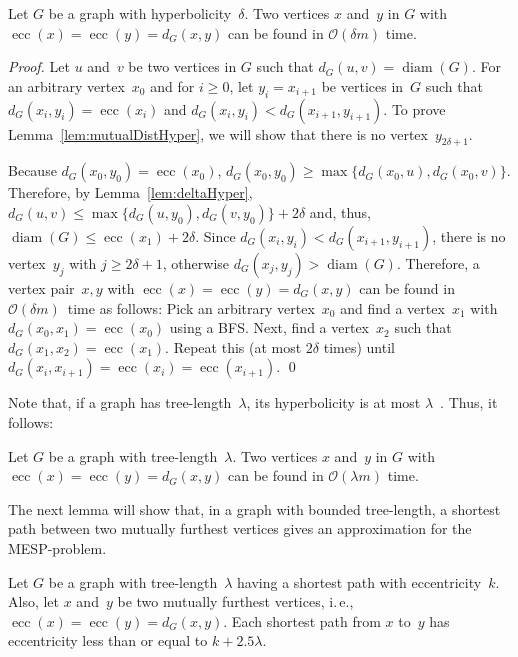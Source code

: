 \documentclass[10pt]{llncs}
\makeatletter
\newcommand{\calO}{\mathcal{O}}
\newcommand{\ie}{i.\,e.\@ifnextchar{,}{}{~}}
\DeclareMathOperator{\ecc}{ecc}
\DeclareMathOperator{\diam}{diam}
\makeatother
\begin{document}
\begin{lemma}
    \label{lem:mutualDistHyper}
Let $G$ be a graph with hyperbolicity~$\delta$.
Two vertices $x$ and~$y$ in $G$ with $\ecc(x) = \ecc(y) = d_G(x, y)$ can be found in $\calO(\delta m)$ time.
\end{lemma}

\begin{proof}
Let $u$ and~$v$ be two vertices in $G$ such that $d_G(u, v) = \diam(G)$.
For an arbitrary vertex~$x_0$ and for $i \geq 0$, let $y_i = x_{i+1}$ be vertices in~$G$ such that $d_G(x_i, y_i) = \ecc(x_i)$ and $d_G(x_i, y_i) < d_G(x_{i+1}, y_{i+1})$.
To prove Lemma~\ref{lem:mutualDistHyper}, we will show that there is no vertex~$y_{2\delta + 1}$.

Because $d_G(x_0, y_0) = \ecc(x_0)$, $d_G(x_0, y_0) \geq \max \{ d_G(x_0, u), d_G(x_0 ,v) \}$.
Therefore, by Lemma~\ref{lem:deltaHyper}, $d_G(u, v) \leq \max \{ d_G(u, y_0), \allowbreak d_G(v, y_0) \} + 2\delta$ and, thus, $\diam(G) \leq \ecc(x_1) + 2\delta$.
Since $d_G(x_i, y_i) < d_G(x_{i+1}, y_{i+1})$, there is no vertex~$y_j$ with $j \geq 2\delta + 1$, otherwise $d_G(x_j, y_j) > \diam(G)$.
Therefore, a vertex pair~$x,y$ with $\ecc(x) = \ecc(y) = d_G(x, y)$ can be found in $\calO(\delta m)$~time as follows:
Pick an arbitrary vertex~$x_0$ and find a vertex~$x_1$ with $d_G(x_0, x_1) = \ecc(x_0)$ using a BFS.
Next, find a vertex~$x_2$ such that $d_G(x_1, x_2) = \ecc(x_1)$.
Repeat this (at most $2\delta$ times) until $d_G(x_i, x_{i+1}) = \ecc(x_i) = \ecc(x_{i+1})$.
\qed
\end{proof}

Note that, if a graph has tree-length~$\lambda$, its hyperbolicity is at most $\lambda$~\cite{CheDraEstHab2008}.
Thus, it follows:

\begin{corollary}
    \label{cor:mutualDistTreeLen}
Let $G$ be a graph with tree-length~$\lambda$.
Two vertices $x$ and~$y$ in $G$ with $\ecc(x) = \ecc(y) = d_G(x, y)$ can be found in $\calO(\lambda m)$ time.
\end{corollary}

The next lemma will show that, in a graph with bounded tree-length, a shortest path between two mutually furthest vertices gives an approximation for the MESP-problem.

\begin{lemma}
    \label{lem:ApproxTreeLen}
Let $G$ be a graph with tree-length~$\lambda$ having a shortest path with eccentricity~$k$.
Also, let $x$ and~$y$ be two mutually furthest vertices, \ie, $\ecc(x) = \ecc(y) = d_G(x, y)$.
Each shortest path from $x$ to~$y$ has eccentricity less than or equal to $k + 2.5 \lambda$.
\end{lemma}
\end{document}
